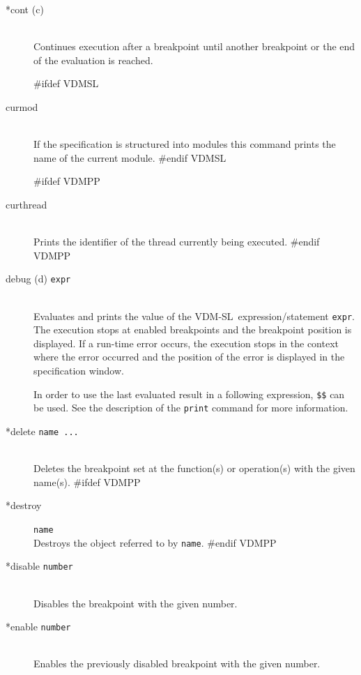 \documentclass[\pformat,12pt]{article}
\newcommand{\vdmslpp}{VDM-SL}
\newcommand{\vdmslpp}{VDM++}
\begin{document}
\begin{description}
\item[*cont (c)] \mbox{}\\
  Continues execution after a breakpoint until another breakpoint or
  the end of the evaluation is reached.

#ifdef VDMSL
\item[curmod] \mbox{}\\
  If the specification is structured into modules this command
  prints the name of the current module.
#endif VDMSL

#ifdef VDMPP
\item[curthread]\mbox{}\\
  Prints the identifier of the thread currently being executed.
#endif VDMPP

\item[debug (d) {\tt expr}]  \mbox{}\\
  Evaluates and prints the value of the \vdmslpp\ expression/statement
  {\tt expr}.  The execution stops at enabled breakpoints
   and the breakpoint position is displayed. If a
  run-time error occurs, the execution stops in the context
  where the error occurred and the position of the error is
  displayed in the specification window.
  
  In order to use the last evaluated result in a following
  expression, {\tt \$\$}\index{\$\$} can be used. See the description
  of the {\tt print} command for more information.
    
\item[*delete {\tt name ...}] \mbox{}\\
  Deletes the breakpoint set at the function(s) or
  operation(s) with the given
  name(s). 
#ifdef VDMPP
\item[*destroy] {\tt name}\mbox{}\\
  Destroys the object referred to by {\tt name}.
#endif VDMPP

\item[*disable \texttt{number}]
\mbox{}\\
  Disables the breakpoint with the given number.

\item[*enable \texttt{number}]
\mbox{}\\
  Enables the previously disabled breakpoint with the given number.


\end{description}
\end{document}
